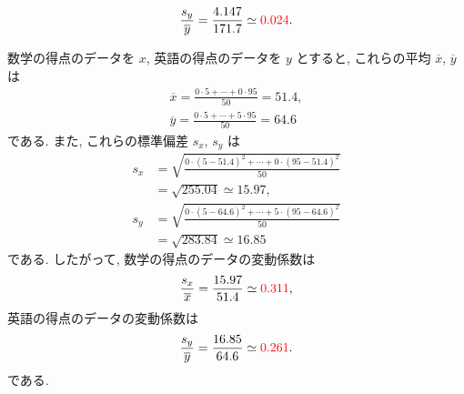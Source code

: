 \begin{qenumerate}
{\begin{align}
			\frac{s_{y}}{\overline{y}} = \frac{4.147}{171.7} \simeq \textcolor{red}{0.024}.
		\end{align}
	}
	\item{
		数学の得点のデータを $x$, 英語の得点のデータを $y$ とすると, これらの平均 $\overline{x}$, $\overline{y}$ は
		\begin{gather}
			\overline{x} = \frac{0\cdot 5 + \cdots + 0\cdot 95}{50} = 51.4, \\
			\overline{y} = \frac{0\cdot 5 + \cdots + 5\cdot 95}{50} = 64.6
		\end{gather}
		である.
		また, これらの標準偏差 $s_{x}$, $s_{y}$ は
		\begin{align}
			s_{x} &= \sqrt{\frac{0\cdot (5 - 51.4)^{2} + \cdots + 0\cdot (95 - 51.4)^{2}}{50}} \\
				&= \sqrt{255.04} \simeq 15.97, \\
			s_{y} &= \sqrt{\frac{0\cdot (5 - 64.6)^{2} + \cdots + 5\cdot (95 - 64.6)^{2}}{50}} \\
				&= \sqrt{283.84} \simeq 16.85
		\end{align}
		である.
		したがって, 数学の得点のデータの変動係数は
		\begin{align}
			\frac{s_{x}}{\overline{x}} = \frac{15.97}{51.4} \simeq \textcolor{red}{0.311}, 
		\end{align}
		英語の得点のデータの変動係数は
		\begin{align}
			\frac{s_{y}}{\overline{y}} = \frac{16.85}{64.6} \simeq \textcolor{red}{0.261}.
		\end{align}
		である.
	}
\end{qenumerate}


